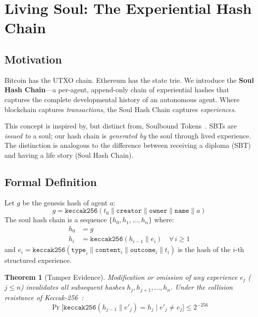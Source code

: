 \documentclass[10pt,a4paper]{article}
\theoremstyle{definition}
\theoremstyle{plain}
\newtheorem{theorem}{Theorem}[section]
\begin{document}
\section{Living Soul: The Experiential Hash Chain}
\label{sec:soul}

\subsection{Motivation}

Bitcoin has the UTXO chain. Ethereum has the state trie. We introduce the \textbf{Soul Hash Chain}---a per-agent, append-only chain of experiential hashes that captures the complete developmental history of an autonomous agent. Where blockchain captures \emph{transactions}, the Soul Hash Chain captures \emph{experiences}.

This concept is inspired by, but distinct from, Soulbound Tokens~\cite{sbt2022}. SBTs are \emph{issued to} a soul; our hash chain is \emph{generated by} the soul through lived experience. The distinction is analogous to the difference between receiving a diploma (SBT) and having a life story (Soul Hash Chain).

\subsection{Formal Definition}

\begin{defbox}
Let $g$ be the genesis hash of agent $a$:
$$g = \texttt{keccak256}(t_0 \| \texttt{creator} \| \texttt{owner} \| \texttt{name} \| a)$$
The soul hash chain is a sequence $\{h_0, h_1, \ldots, h_n\}$ where:
\begin{align}
h_0 &= g \label{eq:genesis}\\
h_i &= \texttt{keccak256}(h_{i-1} \| e_i) \quad \forall\, i \geq 1 \label{eq:chain}
\end{align}
and $e_i = \texttt{keccak256}(\texttt{type}_i \| \texttt{content}_i \| \texttt{outcome}_i \| t_i)$ is the hash of the $i$-th structured experience.
\end{defbox}

\begin{theorem}[Tamper Evidence]\label{thm:tamper}
Modification or omission of any experience $e_j$ ($j \leq n$) invalidates all subsequent hashes $h_j, h_{j+1}, \ldots, h_n$. Under the collision resistance of Keccak-256~\cite{keccak2012}:
$$\Pr\big[\texttt{keccak256}(h_{j-1} \| e'_j) = h_j \;\big|\; e'_j \neq e_j\big] \leq 2^{-256}$$
\end{theorem}
\end{document}

